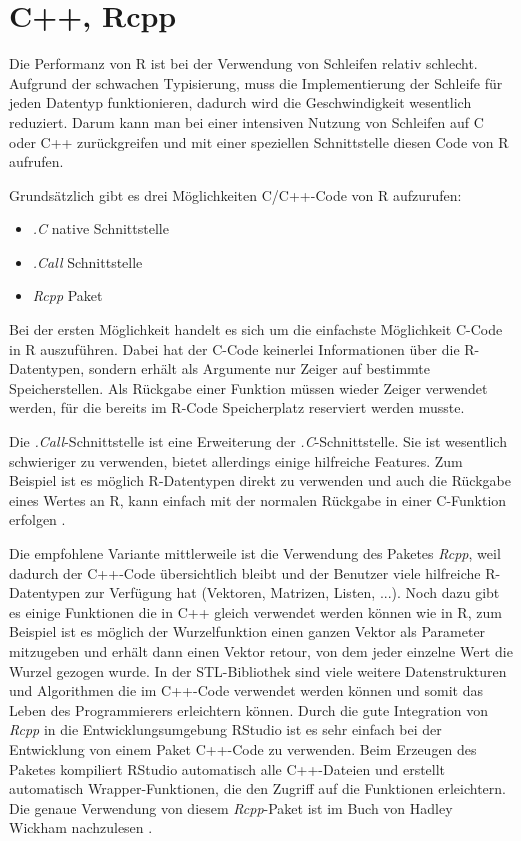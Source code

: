 \section{C++, Rcpp}
\label{sec:Rcpp}
Die Performanz von R ist bei der Verwendung von Schleifen relativ schlecht. Aufgrund der schwachen Typisierung, muss die Implementierung der Schleife für jeden Datentyp funktionieren, dadurch wird die Geschwindigkeit wesentlich reduziert. Darum kann man bei einer intensiven Nutzung von Schleifen auf C oder C++ zurückgreifen und mit einer speziellen Schnittstelle diesen Code von R aufrufen.

Grundsätzlich gibt es drei Möglichkeiten C/C++-Code von R aufzurufen:
\begin{itemize}
	\item \emph{.C} native Schnittstelle
	\item \emph{.Call} Schnittstelle
	\item \emph{Rcpp} Paket
\end{itemize}

Bei der ersten Möglichkeit handelt es sich um die einfachste Möglichkeit C-Code in R auszuführen. Dabei hat der C-Code keinerlei Informationen über die R-Datentypen, sondern erhält als Argumente nur Zeiger auf bestimmte Speicherstellen. Als Rückgabe einer Funktion müssen wieder Zeiger verwendet werden, für die bereits im R-Code Speicherplatz reserviert werden musste.

Die \emph{.Call}-Schnittstelle ist eine Erweiterung der \emph{.C}-Schnittstelle. Sie ist wesentlich schwieriger zu verwenden, bietet allerdings einige hilfreiche Features. Zum Beispiel ist es möglich R-Datentypen direkt zu verwenden und auch die Rückgabe eines Wertes an R, kann einfach mit der normalen Rückgabe in einer C-Funktion erfolgen \cite{wickham2015r}.

Die empfohlene Variante mittlerweile ist die Verwendung des Paketes \emph{Rcpp}, weil dadurch der C++-Code übersichtlich bleibt und der Benutzer viele hilfreiche R-Datentypen zur Verfügung hat (Vektoren, Matrizen, Listen, ...). Noch dazu gibt es einige Funktionen die in C++ gleich verwendet werden können wie in R, zum Beispiel ist es möglich der Wurzelfunktion einen ganzen Vektor als Parameter mitzugeben und erhält dann einen Vektor retour, von dem jeder einzelne Wert die Wurzel gezogen wurde. In der STL-Bibliothek sind viele weitere Datenstrukturen und Algorithmen die im C++-Code verwendet werden können und somit das Leben des Programmierers erleichtern können. Durch die gute Integration von \emph{Rcpp} in die Entwicklungsumgebung RStudio ist es sehr einfach bei der Entwicklung von einem Paket C++-Code zu verwenden. Beim Erzeugen des Paketes kompiliert RStudio automatisch alle C++-Dateien und erstellt automatisch Wrapper-Funktionen, die den Zugriff auf die Funktionen erleichtern. Die genaue Verwendung von diesem \emph{Rcpp}-Paket ist im Buch von Hadley Wickham nachzulesen \cite{wickham2015advanced}. 

